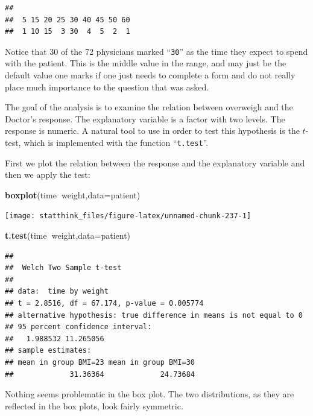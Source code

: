 \documentclass[
]{krantz}
\makeatletter
\newenvironment{Shaded}{\begin{snugshade}}{\end{snugshade}}
\newcommand{\DataTypeTok}[1]{\textcolor[rgb]{0.13,0.29,0.53}{#1}}
\newcommand{\KeywordTok}[1]{\textcolor[rgb]{0.13,0.29,0.53}{\textbf{#1}}}
\newcommand{\NormalTok}[1]{#1}
\newcommand{\OperatorTok}[1]{\textcolor[rgb]{0.81,0.36,0.00}{\textbf{#1}}}
\newenvironment{kframe}{%
\medskip{}
\setlength{\fboxsep}{.8em}
 \def\at@end@of@kframe{}%
 \ifinner\ifhmode%
  \def\at@end@of@kframe{\end{minipage}}%
  \begin{minipage}{\columnwidth}%
 \fi\fi%
 \def\FrameCommand##1{\hskip\@totalleftmargin \hskip-\fboxsep
 \colorbox{shadecolor}{##1}\hskip-\fboxsep
     \hskip-\linewidth \hskip-\@totalleftmargin \hskip\columnwidth}%
 \MakeFramed {\advance\hsize-\width
   \@totalleftmargin\z@ \linewidth\hsize
   \@setminipage}}%
 {\par\unskip\endMakeFramed%
 \at@end@of@kframe}
\renewenvironment{Shaded}{\begin{kframe}}{\end{kframe}}
\theoremstyle{definition}
\theoremstyle{definition}
\theoremstyle{definition}
\theoremstyle{remark}
\makeatother
\begin{document}
\begin{verbatim}
## 
##  5 15 20 25 30 40 45 50 60 
##  1 10 15  3 30  4  5  2  1
\end{verbatim}

Notice that 30 of the 72 physicians marked ``\texttt{30}'' as the time they
expect to spend with the patient. This is the middle value in the range,
and may just be the default value one marks if one just needs to
complete a form and do not really place much importance to the question
that was asked.

The goal of the analysis is to examine the relation between overweigh
and the Doctor's response. The explanatory variable is a factor with two
levels. The response is numeric. A natural tool to use in order to test
this hypothesis is the \(t\)-test, which is implemented with the function
``\texttt{t.test}''.

First we plot the relation between the response and the explanatory
variable and then we apply the test:

\begin{Shaded}
\begin{Highlighting}[]
\KeywordTok{boxplot}\NormalTok{(time}\OperatorTok{~}\NormalTok{weight,}\DataTypeTok{data=}\NormalTok{patient)}
\end{Highlighting}
\end{Shaded}

\begin{center}\texttt{[image: statthink\_files/figure-latex/unnamed-chunk-237-1]} \end{center}

\begin{Shaded}
\begin{Highlighting}[]
\KeywordTok{t.test}\NormalTok{(time}\OperatorTok{~}\NormalTok{weight,}\DataTypeTok{data=}\NormalTok{patient)}
\end{Highlighting}
\end{Shaded}

\begin{verbatim}
## 
##  Welch Two Sample t-test
## 
## data:  time by weight
## t = 2.8516, df = 67.174, p-value = 0.005774
## alternative hypothesis: true difference in means is not equal to 0
## 95 percent confidence interval:
##   1.988532 11.265056
## sample estimates:
## mean in group BMI=23 mean in group BMI=30 
##             31.36364             24.73684
\end{verbatim}

Nothing seems problematic in the box plot.
The two distributions, as they are reflected in the box plots, look
fairly symmetric.
\end{document}
